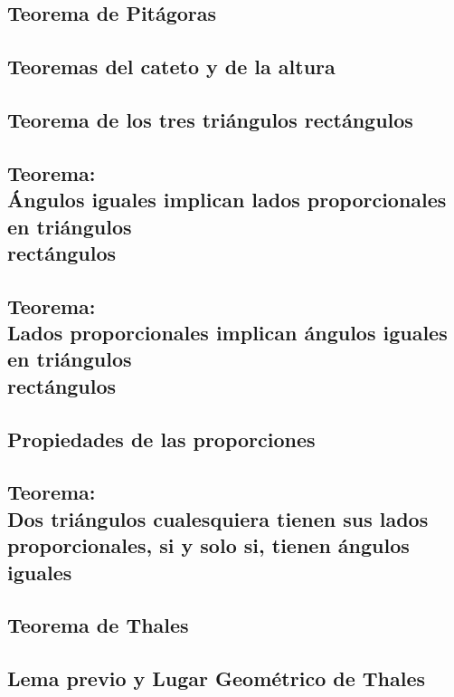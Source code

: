 \documentclass[12pt]{article}
\begin{document}
\subsection{Teorema de Pitágoras}
\lipsum[2]

\subsection{Teoremas del cateto y de la altura}
\lipsum[2]

\subsection{Teorema de los tres triángulos rectángulos}
\lipsum[2]

\subsection{
  Teorema: \\
  Ángulos iguales implican lados proporcionales en triángulos \\ rectángulos
}
\lipsum[2]

\subsection{
  Teorema: \\
  Lados proporcionales implican ángulos iguales en triángulos \\ rectángulos
}
\lipsum[2]

\subsection{Propiedades de las proporciones}
\lipsum[2]

\subsection{
  Teorema: \\
  Dos triángulos cualesquiera tienen sus lados proporcionales, si y solo si, tienen ángulos iguales
}
\lipsum[2]

\subsection{Teorema de Thales}
\lipsum[2]

\subsection{Lema previo y Lugar Geométrico de Thales}
\lipsum[2]
\end{document}

